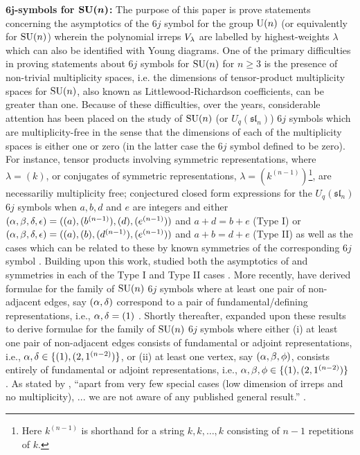 \documentclass[notitlepage, 10pt]{article}
\begin{document}
\vspace{1em}
\textbf{$\boldsymbol{6j}$-symbols for $\boldsymbol{\operatorname{SU}(n)}$:}
The purpose of this paper is prove statements concerning the asymptotics of the $6j$ symbol for the group $\operatorname{U}(n)$ (or equivalently for $\operatorname{SU}(n)$) wherein the polynomial irreps $V_{\lambda}$ are labelled by highest-weights $\lambda$ which can also be identified with Young diagrams.
One of the primary difficulties in proving statements about $6j$ symbols for $\operatorname{SU}(n)$ for $n\geq 3$ is the presence of non-trivial multiplicity spaces, i.e. the dimensions of tensor-product multiplicity spaces for $\operatorname{SU}(n)$, also known as Littlewood-Richardson coefficients, can be greater than one.
Because of these difficulties, over the years, considerable attention has been placed on the study of $\operatorname{SU}(n)$ (or $U_q(\mathfrak{sl}_n)$) $6j$ symbols which are multiplicity-free in the sense that the dimensions of each of the multiplicity spaces is either one or zero (in the latter case the $6j$ symbol defined to be zero).
For instance, tensor products involving symmetric representations, where $\lambda = (k)$, or conjugates of symmetric representations, $\lambda = (k^{(n-1)})$\footnote{Here $k^{(n-1)}$ is shorthand for a string $k, k, \ldots, k$ consisting of $n-1$ repetitions of $k$.}, are necessariliy multiplicity free; \citeauthor{nawata2013multiplicity} conjectured closed form expressions for the $U_q(\mathfrak{sl}_n)$ $6j$ symbols when $a,b,d$ and $e$ are integers and either $(\alpha,\beta,\delta,\epsilon) = ((a), (b^{(n-1)}), (d), (e^{(n-1)}))$ and $a+d=b+e$ (Type I) or $(\alpha,\beta,\delta,\epsilon) = ((a), (b), (d^{(n-1)}), (e^{(n-1)}))$ and $a+b=d+e$ (Type II) as well as the cases which can be related to these by known symmetries of the corresponding $6j$ symbol \cite{nawata2013multiplicity}.
Building upon this work, \citeauthor{alekseev2020multiplicity} studied both the asymptotics of and symmetries in each of the Type I and Type II cases \cite{alekseev2020multiplicity}.
More recently, \citeauthor{alcock2023wigner} have derived formulae for the family of $\operatorname{SU}(n)$ $6j$ symbols where at least one pair of non-adjacent edges, say $(\alpha, \delta)$ correspond to a pair of fundamental/defining representations, i.e., $\alpha, \delta = (1)$ \cite{alcock2023wigner}.
Shortly thereafter, \citeauthor{keppeler2024wigner} expanded upon these results to derive formulae for the family of $\operatorname{SU}(n)$ $6j$ symbols where either (i) at least one pair of non-adjacent edges consists of fundamental or adjoint representations, i.e., $\alpha,\delta \in \{(1), (2, 1^{(n-2)})\}$, or (ii) at least one vertex, say $(\alpha,\beta,\phi)$, consists entirely of fundamental or adjoint representations, i.e., $\alpha,\beta,\phi \in \{(1), (2, 1^{(n-2)})\}$ \cite{keppeler2024wigner}.
As stated by \citeauthor{coquereaux2023integer}, ``apart from very few special cases (low dimension of irreps and no multiplicity), ... we are not aware of any published general result.'' \cite{coquereaux2023integer}.
\end{document}
